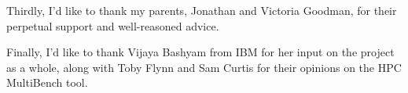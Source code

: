 Thirdly, I'd like to thank my parents, Jonathan and Victoria Goodman, for their perpetual support and well-reasoned advice.

Finally, I'd like to thank Vijaya Bashyam from IBM for her input on the project as a whole, along with Toby Flynn and Sam Curtis for their opinions on the HPC MultiBench tool. %


